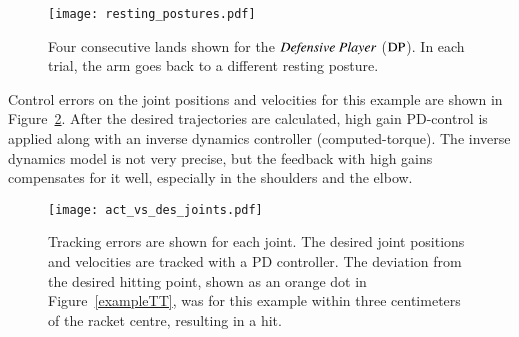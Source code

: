 %
%
\begin{figure}
	\centering
	\texttt{[image: resting\_postures.pdf]}
	\caption{Four consecutive lands shown for the $\emph{Defensive Player}$ ($\mathrm{DP}$). In each trial, the arm goes back to a different resting posture.}
	\label{resting_posture_dp}
\end{figure}%
%
Control errors on the joint positions and velocities for this example are shown in Figure~\ref{control-error}. After the desired trajectories are calculated, high gain PD-control is applied along with an inverse dynamics controller (computed-torque). The inverse dynamics model is not very precise, but the feedback with high gains compensates for it well, especially in the shoulders and the elbow. %
%
%
%
%
\begin{figure}
  	\centering
  	\texttt{[image: act\_vs\_des\_joints.pdf]}
  	\caption{Tracking errors are shown for each joint. The desired joint positions and velocities are tracked with a PD controller. The deviation from the desired hitting point, shown as an orange dot in Figure~\ref{exampleTT}, was for this example within three centimeters of the racket centre, resulting in a hit.}
  	\label{control-error}
\end{figure}
%
